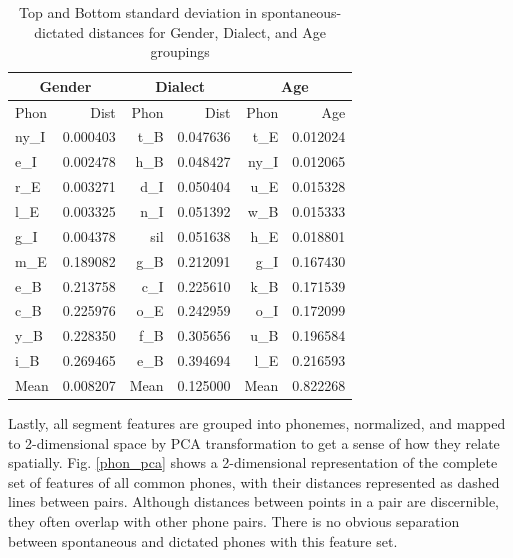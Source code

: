 \documentclass[conference]{IEEEtran}
\begin{document}
\begin{table}[!htb]
\renewcommand{\arraystretch}{1.3}
    \caption{Top and Bottom standard deviation in spontaneous-dictated distances for Gender, Dialect, and Age groupings}
\label{group_dist}
\centering
\begin{tabular}{|l|r|r|r|r|r|}
    \hline
    \multicolumn{2}{|c|}{\textbf{Gender}} &
    \multicolumn{2}{|c|}{\textbf{Dialect}} &
    \multicolumn{2}{|c|}{\textbf{Age}} \\
    \hline
    Phon & Dist & Phon & Dist & Phon & Age \\
    \hline
    ny\_I &  0.000403 & t\_B  &  0.047636 & t\_E  &  0.012024 \\
    e\_I  &  0.002478 & h\_B  &  0.048427 & ny\_I &  0.012065 \\
    r\_E  &  0.003271 & d\_I  &  0.050404 & u\_E  &  0.015328 \\
    l\_E  &  0.003325 & n\_I  &  0.051392 & w\_B  &  0.015333 \\
    g\_I  &  0.004378 & sil  &  0.051638 & h\_E  &  0.018801 \\
\hline
    m\_E  &  0.189082 & g\_B  &  0.212091 & g\_I  &  0.167430 \\
    e\_B  &  0.213758 & c\_I  &  0.225610 & k\_B  &  0.171539 \\
    c\_B  &  0.225976 & o\_E  &  0.242959 & o\_I  &  0.172099 \\
    y\_B  &  0.228350 & f\_B  &  0.305656 & u\_B  &  0.196584 \\
    i\_B  &  0.269465 & e\_B  &  0.394694 & l\_E  &  0.216593 \\
    \hline
    Mean  &  0.008207 & Mean  &  0.125000 & Mean  &  0.822268 \\
    \hline
\end{tabular}
\end{table}

Lastly, all segment features are grouped into phonemes, normalized, and mapped to 2-dimensional space by PCA transformation to get a sense of how they relate spatially.
Fig. \ref{phon_pca} shows a 2-dimensional representation of the complete set of features of all common phones, with their distances represented as dashed lines between pairs.
Although distances between points in a pair are discernible, they often overlap with other phone pairs.
There is no obvious separation between spontaneous and dictated phones with this feature set.
\end{document}
